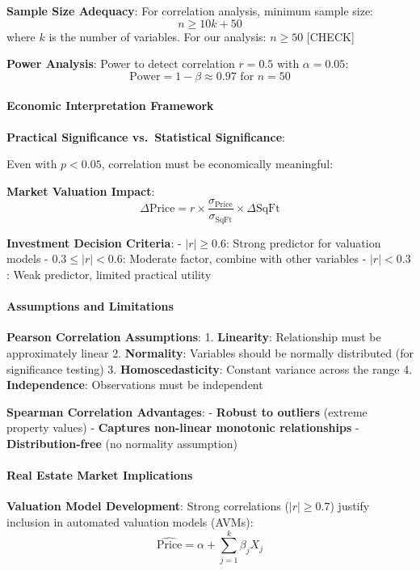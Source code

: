 \documentclass[11pt]{article}
\begin{document}
\textbf{Sample Size Adequacy}: For correlation analysis, minimum sample
size: \[n \geq 10k + 50\] where \(k\) is the number of variables. For
our analysis: \(n \geq 50\) {[}CHECK{]}

\textbf{Power Analysis}: Power to detect correlation \(r = 0.5\) with
\(\alpha = 0.05\):
\[\text{Power} = 1 - \beta \approx 0.97 \text{ for } n = 50\]

\paragraph{Economic Interpretation
Framework}\label{economic-interpretation-framework}

\textbf{Practical Significance vs.~Statistical Significance}:

Even with \(p < 0.05\), correlation must be economically meaningful:

\textbf{Market Valuation Impact}:
\[\Delta \text{Price} = r \times \frac{\sigma_{\text{Price}}}{\sigma_{\text{SqFt}}} \times \Delta \text{SqFt}\]

\textbf{Investment Decision Criteria}: - \(|r| \geq 0.6\): Strong
predictor for valuation models - \(0.3 \leq |r| < 0.6\): Moderate
factor, combine with other variables - \(|r| < 0.3\): Weak predictor,
limited practical utility

\paragraph{Assumptions and
Limitations}\label{assumptions-and-limitations}

\textbf{Pearson Correlation Assumptions}: 1. \textbf{Linearity}:
Relationship must be approximately linear 2. \textbf{Normality}:
Variables should be normally distributed (for significance testing) 3.
\textbf{Homoscedasticity}: Constant variance across the range 4.
\textbf{Independence}: Observations must be independent

\textbf{Spearman Correlation Advantages}: - \textbf{Robust to outliers}
(extreme property values) - \textbf{Captures non-linear monotonic
relationships} - \textbf{Distribution-free} (no normality assumption)

\paragraph{Real Estate Market
Implications}\label{real-estate-market-implications}

\textbf{Valuation Model Development}: Strong correlations
(\(|r| \geq 0.7\)) justify inclusion in automated valuation models
(AVMs): \[\hat{\text{Price}} = \alpha + \sum_{j=1}^{k} \beta_j X_j\]
\end{document}
